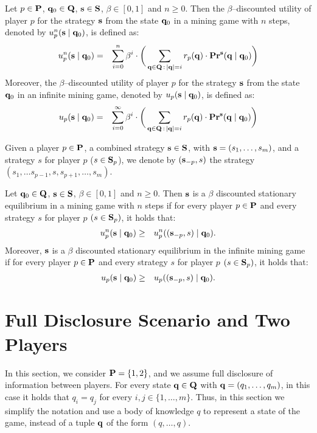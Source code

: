 \documentclass{article}
\begin{document}
\begin{mydef}
Let $p \in \mathbf{P}$, $\mathbf{q}_0 \in \mathbf{Q}$, $\mathbf{s} \in \mathbf{S}$, $\beta \in [0,1]$ and $n \geq 0$. Then the $\beta$--discounted utility of player $p$ for the strategy $\mathbf{s}$ from the state $\mathbf{q}_0$ in a mining game with $n$ steps, denoted by $u_p^n(\mathbf{s} \mid \mathbf{q}_0)$, is defined as:
\begin{eqnarray*}
u_p^n(\mathbf{s} \mid \mathbf{q}_0) & = & \sum_{i=0}^{n}\beta^{i} \cdot  \bigg(\sum_{\mathbf{q} \in \mathbf{Q} \,:\, |\mathbf{q}| = i} r_p(\mathbf{q}) \cdot 
\mathbf{Pr}^{\mathbf{s}}(\mathbf{q} \mid \mathbf{q}_0)\bigg)
\end{eqnarray*}
Moreover, the $\beta$--discounted utility of player $p$ for the strategy $\mathbf{s}$ from the state $\mathbf{q}_0$ in an infinite mining game, denoted by $u_p(\mathbf{s} \mid \mathbf{q}_0)$, is defined as:
\begin{eqnarray*}
u_p(\mathbf{s} \mid \mathbf{q}_0) & = & \sum_{i=0}^{\infty}\beta^{i} \cdot  \bigg(\sum_{\mathbf{q} \in \mathbf{Q} \,:\, |\mathbf{q}| = i} r_p(\mathbf{q}) \cdot 
\mathbf{Pr}^{\mathbf{s}}(\mathbf{q} \mid \mathbf{q}_0)\bigg)
\end{eqnarray*}
\end{mydef}
Given a player $p \in \mathbf{P}$, a combined strategy $\mathbf{s} \in \mathbf{S}$, with $\mathbf{s} = (s_1, \ldots, s_m)$, and a strategy $s$ for player $p$ ($s \in \mathbf{S}_p$), we denote by $(\mathbf{s}_{-p}, s)$ the strategy $(s_1, \ldots s_{p-1},s,s_{p+1}, \ldots, s_{m})$.
\begin{mydef}
Let $\mathbf{q}_0 \in \mathbf{Q}$, $\mathbf{s} \in \mathbf{S}$, $\beta \in [0,1]$ and $n \geq 0$. Then $\mathbf{s}$ is a $\beta$ discounted stationary equilibrium in a mining game with $n$ steps if for every player $p \in \mathbf{P}$ and every strategy $s$ for player $p$ $(s \in\mathbf{S}_p)$, it holds that:
\begin{eqnarray*}
u_p^n(\mathbf{s} \mid \mathbf{q}_0)  & \geq  & u_p^n((\mathbf{s}_{-p},s) \mid \mathbf{q}_0).
\end{eqnarray*}
Moreover, $\mathbf{s}$ is a $\beta$ discounted stationary equilibrium  in  the infinite mining game if for every player $p \in \mathbf{P}$ and every strategy $s$ for player $p$ $(s \in\mathbf{S}_p)$, it holds that:
\begin{eqnarray*}u_p(\mathbf{s} \mid \mathbf{q}_0)  & \geq  & u_p ((\mathbf{s}_{-p},s) \mid \mathbf{q}_0).
\end{eqnarray*}
\end{mydef}



\section{Full Disclosure Scenario and Two Players}
In this section, we consider $\mathbf{P} = \{1,2\}$, and we assume full disclosure of information between players.
For every state $\mathbf{q} \in \mathbf{Q}$ with $\mathbf{q} = (q_1, \ldots, q_m)$, in this case it holds that $q_i = q_j$ for every $i,j \in \{1, \ldots, m\}$. Thus, in this section we simplify the notation and use a body of knowledge $q$ to represent a state of the game, instead of a tuple $\mathbf{q}$ of the form $(q, \ldots, q)$.
\end{document}
